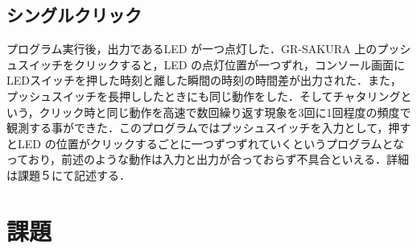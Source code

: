 \documentclass {ujarticle}
\begin{document}
 \subsection{シングルクリック}
 プログラム実行後，出力であるLED が一つ点灯した．GR-SAKURA 上のプッシュスイッチをクリックすると，LED の点灯位置が一つずれ，コンソール画面にLEDスイッチを押した時刻と離した瞬間の時刻の時間差が出力された．また，プッシュスイッチを長押ししたときにも同じ動作をした．そしてチャタリングという，クリック時と同じ動作を高速で数回繰り返す現象を3回に1回程度の頻度で観測する事ができた．このプログラムではプッシュスイッチを入力として，押すとLED の位置がクリックするごとに一つずつずれていくというプログラムとなっており，前述のような動作は入力と出力が合っておらず不具合といえる．詳細は課題５にて記述する．
 
 \section{課題}
\end{document}
